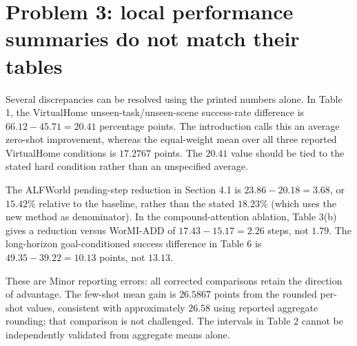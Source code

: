\documentclass[10pt]{article}
\begin{document}
\section*{Problem 3: local performance summaries do not match their tables}
Several discrepancies can be resolved using the printed numbers alone. In Table 1, the VirtualHome unseen-task/unseen-scene success-rate difference is \(66.12-45.71=20.41\) percentage points. The introduction calls this an average zero-shot improvement, whereas the equal-weight mean over all three reported VirtualHome conditions is \(17.2767\) points. The \(20.41\) value should be tied to the stated hard condition rather than an unspecified average.\par
The ALFWorld pending-step reduction in Section 4.1 is \(23.86-20.18=3.68\), or \(15.42\%\) relative to the baseline, rather than the stated \(18.23\%\) (which uses the new method as denominator). In the compound-attention ablation, Table 3(b) gives a reduction versus WorMI-ADD of \(17.43-15.17=2.26\) steps, not \(1.79\). The long-horizon goal-conditioned success difference in Table 6 is \(49.35-39.22=10.13\) points, not \(13.13\).\par
These are Minor reporting errors: all corrected comparisons retain the direction of advantage. The few-shot mean gain is \(26.5867\) points from the rounded per-shot values, consistent with approximately \(26.58\) using reported aggregate rounding; that comparison is not challenged. The intervals in Table 2 cannot be independently validated from aggregate means alone.\par
\end{document}
